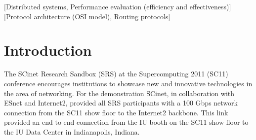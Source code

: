 \documentclass[]{sigplan-proc}
\begin{document}
\begin{abstract}

  As part of the SCinet Research Sandbox at the Supercomputing 2011 conference, Indiana University utilized a
  dedicated 100 Gbps wide area network (WAN) link spanning more than 3,500 km (2,175 mi) to demonstrate the
  capabilities of the Lustre high performance parallel file system in a high bandwidth, high latency WAN
  environment. This demonstration functioned as a proof of concept and provided an opportunity to study
  Lustre's performance over a 100 Gbps WAN. To characterize the performance of the network and file system a
  series of benchmarks and tests were undertaken. These included low level iperf network tests, Lustre
  networking (LNET) tests, file system tests with the IOR benchmark, and a suite of real-world applications reading
  and writing to the file system. All of the tests and benchmarks were run over a the WAN link with a latency
  of 50.5 ms. In this article we describe the configuration and constraints of the demonstration and focus in
  on the key findings and discoveries made regarding the Lustre networking layer for this extremely high
  bandwidth and high latency connection. Of particular interest is the relationship between the {\tt peer\_credits}
  and {\tt max\_rpcs\_in\_flight} settings when considering LNET performance.

\end{abstract}

[Distributed systems, Performance evaluation (efficiency and effectiveness)]
[Protocol architecture (OSI model),
Routing protocols]


\vspace{0.25in}
\section{Introduction}\label{sec:intro}

The SCinet Research Sandbox (SRS) at the Supercomputing 2011 (SC11) conference encourages institutions to
showcase new and innovative technologies in the area of networking. For the demonstration SCinet, in
collaboration with ESnet and Internet2, provided all SRS participants with a 100 Gbps network connection from
the SC11 show floor to the Internet2 backbone. This link provided an end-to-end connection from the IU booth
on the SC11 show floor to the IU Data Center in Indianapolis, Indiana. 
\end{document}

